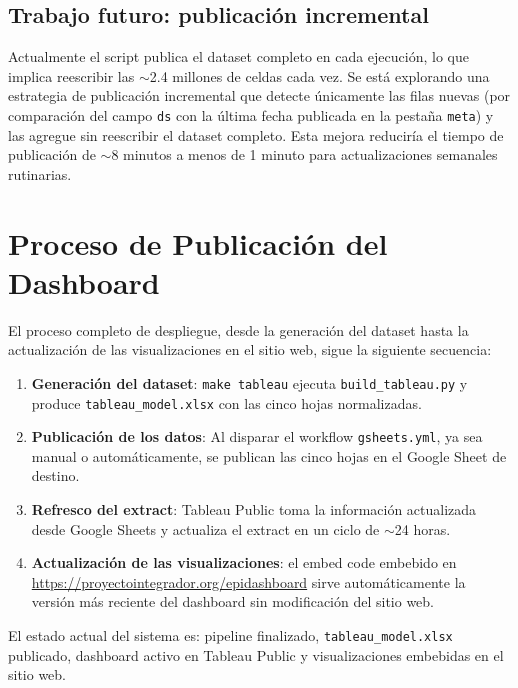 \documentclass[12pt, letterpaper]{article}
\begin{document}
\subsection{Trabajo futuro: publicación incremental}

Actualmente el script publica el dataset completo en cada ejecución, lo que implica reescribir las $\sim$2.4 millones de celdas cada vez. Se está explorando una estrategia de publicación incremental que detecte únicamente las filas nuevas (por comparación del campo \texttt{ds} con la última fecha publicada en la pestaña \texttt{meta}) y las agregue sin reescribir el dataset completo. Esta mejora reduciría el tiempo de publicación de $\sim$8 minutos a menos de 1 minuto para actualizaciones semanales rutinarias.

\newpage
\section{Proceso de Publicación del Dashboard}\label{sec:publicacion}

El proceso completo de despliegue, desde la generación del dataset hasta la actualización de las visualizaciones en el sitio web, sigue la siguiente secuencia:

\begin{enumerate}[noitemsep]
    \item \textbf{Generación del dataset}: \texttt{make tableau} ejecuta \texttt{build\_tableau.py} y produce \texttt{tableau\_model.xlsx} con las cinco hojas normalizadas.
    \item \textbf{Publicación de los datos}: Al disparar el workflow \texttt{gsheets.yml}, ya sea manual o automáticamente, se publican las cinco hojas en el Google Sheet de destino.
    \item \textbf{Refresco del extract}: Tableau Public toma la información actualizada desde Google Sheets y actualiza el extract en un ciclo de $\sim$24 horas.
    \item \textbf{Actualización de las visualizaciones}: el embed code embebido en \url{https://proyectointegrador.org/epidashboard} sirve automáticamente la versión más reciente del dashboard sin modificación del sitio web.
\end{enumerate}

El estado actual del sistema es: pipeline finalizado, \texttt{tableau\_model.xlsx} publicado, dashboard activo en Tableau Public y visualizaciones embebidas en el sitio web.
\end{document}
